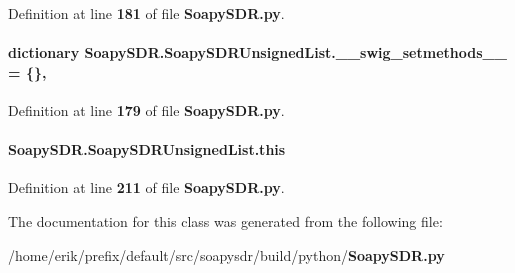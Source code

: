 Definition at line {\bf 181} of file {\bf Soapy\+S\+D\+R.\+py}.

\paragraph[{\+\_\+\+\_\+swig\+\_\+setmethods\+\_\+\+\_\+}]{\setlength{\rightskip}{0pt plus 5cm}dictionary Soapy\+S\+D\+R.\+Soapy\+S\+D\+R\+Unsigned\+List.\+\_\+\+\_\+swig\+\_\+setmethods\+\_\+\+\_\+ = \{\}\hspace{0.3cm}{\ttfamily [static]}, {\ttfamily [private]}}\label{classSoapySDR_1_1SoapySDRUnsignedList_a32866ae857f1e35233cdd6ba94c0730b}


Definition at line {\bf 179} of file {\bf Soapy\+S\+D\+R.\+py}.

\paragraph[{this}]{\setlength{\rightskip}{0pt plus 5cm}Soapy\+S\+D\+R.\+Soapy\+S\+D\+R\+Unsigned\+List.\+this}\label{classSoapySDR_1_1SoapySDRUnsignedList_a5b2e325619fbd5afe18d3cae422aab61}


Definition at line {\bf 211} of file {\bf Soapy\+S\+D\+R.\+py}.



The documentation for this class was generated from the following file\+:\begin{DoxyCompactItemize}
\item 
/home/erik/prefix/default/src/soapysdr/build/python/{\bf Soapy\+S\+D\+R.\+py}\end{DoxyCompactItemize}
